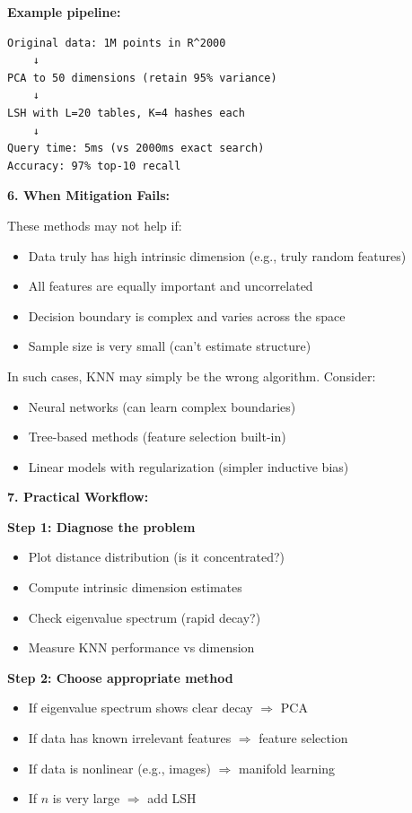 \documentclass[12pt]{article}
\begin{document}
\begin{explanation}
\textbf{Example pipeline:}

\begin{verbatim}
Original data: 1M points in R^2000
    ↓
PCA to 50 dimensions (retain 95% variance)
    ↓
LSH with L=20 tables, K=4 hashes each
    ↓
Query time: 5ms (vs 2000ms exact search)
Accuracy: 97% top-10 recall
\end{verbatim}

\textbf{6. When Mitigation Fails:}

These methods may not help if:
\begin{itemize}
    \item Data truly has high intrinsic dimension (e.g., truly random features)
    \item All features are equally important and uncorrelated
    \item Decision boundary is complex and varies across the space
    \item Sample size is very small (can't estimate structure)
\end{itemize}

In such cases, KNN may simply be the wrong algorithm. Consider:
\begin{itemize}
    \item Neural networks (can learn complex boundaries)
    \item Tree-based methods (feature selection built-in)
    \item Linear models with regularization (simpler inductive bias)
\end{itemize}

\textbf{7. Practical Workflow:}

\textbf{Step 1: Diagnose the problem}
\begin{itemize}
    \item Plot distance distribution (is it concentrated?)
    \item Compute intrinsic dimension estimates
    \item Check eigenvalue spectrum (rapid decay?)
    \item Measure KNN performance vs dimension
\end{itemize}

\textbf{Step 2: Choose appropriate method}
\begin{itemize}
    \item If eigenvalue spectrum shows clear decay \(\Rightarrow\) PCA
    \item If data has known irrelevant features \(\Rightarrow\) feature selection
    \item If data is nonlinear (e.g., images) \(\Rightarrow\) manifold learning
    \item If \(n\) is very large \(\Rightarrow\) add LSH
\end{itemize}


\end{explanation}
\end{document}
